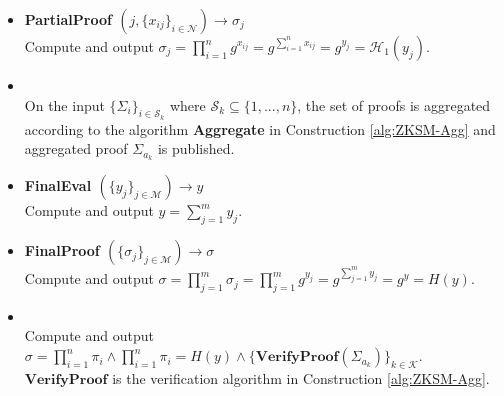 \begin{algorithm}
\begin{itemize}
\item\textbf{PartialProof $(j,\{x_{ij}\}_{i\in\mathcal{N}})\xrightarrow[]{}\sigma_j$}\\
Compute and output $\sigma_j = \prod_{i=1}^n g^{x_{ij}} =  g^{\sum_{i=1}^n x_{ij}}= g^{y_j}=\mathcal{H}_1(y_j)$.

\item {} \\
On the input $\{ \Sigma_i \}_{i\in\mathcal{S}_k}$ where $\mathcal{S}_k\subseteq\{1,...,n\}$, the set of proofs is aggregated according to the algorithm \textbf{Aggregate} in Construction \ref{alg:ZKSM-Agg} and  aggregated proof $\Sigma_{a_k}$ is published. 

\item\textbf{FinalEval $(\{y_j\}_{j\in\mathcal{M}})\xrightarrow[]{}y$}\\
Compute and output $y = \sum_{j=1}^m y_{j}$.

\item\textbf{FinalProof $(\{\sigma_j\}_{j\in\mathcal{M}})\xrightarrow[]{}\sigma$}\\
Compute and output $\sigma = \prod_{j=1}^m \sigma_j = \prod_{j=1}^m g^{y_{j}} =  g^{\sum_{j=1}^m y_{j}}= g^{y}=H(y)$.

\item{}\\
Compute and output $\sigma= \prod_{i=1}^n \pi_i \wedge \prod_{i=1}^n \pi_i = H(y)\wedge \{\textbf{VerifyProof}(\Sigma_{a_k})\}_{k\in\mathcal{K}}$. $\textbf{VerifyProof}$ is the verification algorithm in Construction \ref{alg:ZKSM-Agg}.
\end{itemize}
\label{alg:VAHSS-HSS-RP-Agg}
\end{algorithm}




